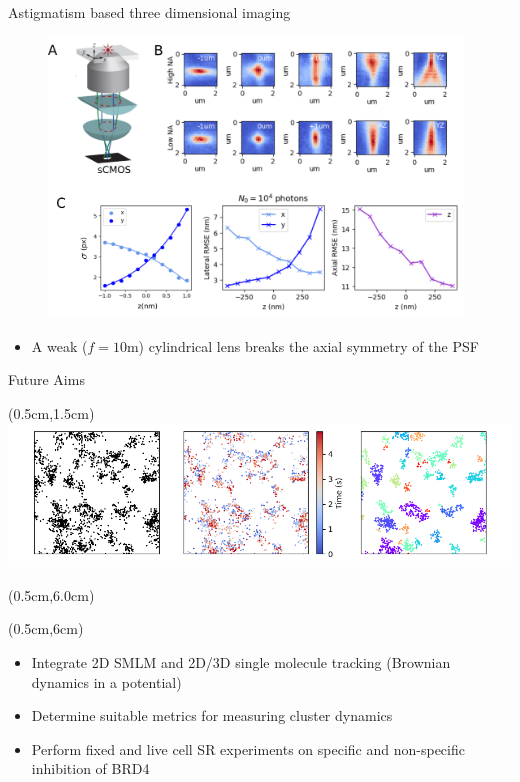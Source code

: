 \documentclass{beamer}					%
\begin{document}
\begin{frame}{Astigmatism based three dimensional imaging}
\begin{figure}
\includegraphics[width=11cm]{Astigmatism.png}
\end{figure}
\begin{itemize}
\item A weak ($f=10$m) cylindrical lens breaks the axial symmetry of the PSF
\end{itemize}
\end{frame}

\begin{frame}{Future Aims}

\begin{textblock*}{13cm}(0.5cm,1.5cm)
\includegraphics[width=\textwidth]{Cluster2.png}
\end{textblock*}

\begin{textblock*}{13cm}(0.5cm,6.0cm)
\end{textblock*}

\begin{textblock*}{\textwidth}(0.5cm,6cm)
\begin{itemize}
\item Integrate 2D SMLM and 2D/3D single molecule tracking (Brownian dynamics in a potential)
\item Determine suitable metrics for measuring cluster dynamics
\item Perform fixed and live cell SR experiments on specific and non-specific inhibition of BRD4
\end{itemize}
\end{textblock*}



\end{frame}
\end{document}
